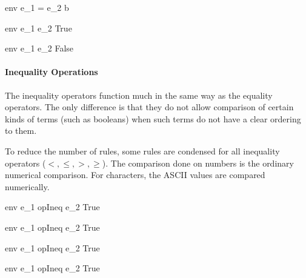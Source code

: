 \documentclass{article}
\begin{document}
	{\mbox{env} \vdash e_1 = e_2 \Downarrow b}
	
\bigskip
	
	{\mbox{env} \vdash e_1 \neq e_2 \Downarrow True}
	
	{\mbox{env} \vdash e_1 \neq e_2 \Downarrow False}
	
\bigskip

\paragraph{Inequality Operations}
The inequality operators function much in the same way as the equality operators.
The only difference is that they do not allow comparison of certain kinds of terms (such as booleans) when such terms do not have a clear ordering to them.

To reduce the number of rules, some rules are condensed for all inequality operators ($<, \leq, >, \geq$).
The comparison done on numbers is the ordinary numerical comparison.
For characters, the ASCII values are compared numerically.

	{\mbox{env} \vdash e_1 \; opIneq \; e_2 \Downarrow True}
	
	{\mbox{env} \vdash e_1 \; opIneq \; e_2 \Downarrow True}
	
\medskip

	{\mbox{env} \vdash e_1 \; opIneq \; e_2 \Downarrow True}
	
	{\mbox{env} \vdash e_1 \; opIneq \; e_2 \Downarrow True}
\end{document}
